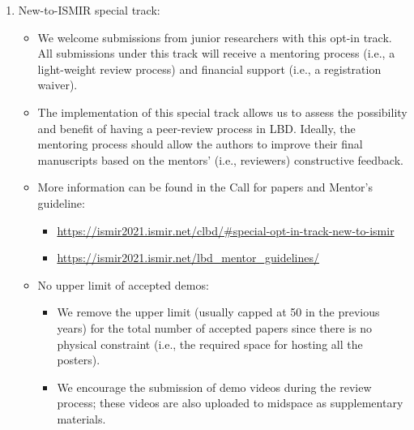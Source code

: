 \documentclass[%
10pt,								%
]
{scrartcl}
\begin{document}
            \begin{enumerate}
                \item New-to-ISMIR special track:
                    \begin{itemize}
                        \item We welcome submissions from junior researchers with this opt-in track. All submissions under this track will receive a mentoring process (i.e., a light-weight review process) and financial support (i.e., a registration waiver).

                        \item   The implementation of this special track allows us to assess the possibility and benefit of having a peer-review process in LBD. Ideally, the mentoring process should allow the authors to improve their final manuscripts based on the mentors’ (i.e., reviewers) constructive feedback.  
                        \item   More information can be found in the Call for papers and Mentor's guideline: 
                            \begin{itemize}
                                \item \href{https://ismir2021.ismir.net/clbd/#special-opt-in-track-new-to-ismir}{https://ismir2021.ismir.net/clbd/\#special-opt-in-track-new-to-ismir}
                                \item \href{https://ismir2021.ismir.net/lbd_mentor_guidelines/}{https://ismir2021.ismir.net/lbd\_mentor\_guidelines/}
                            \end{itemize}

                        \item   No upper limit of accepted demos: 
                            \begin{itemize}
                                \item We remove the upper limit (usually capped at 50 in the previous years) for the total number of accepted papers since there is no physical constraint (i.e., the required space for hosting all the posters).

                                \item   We encourage the submission of demo videos during the review process; these videos are also uploaded to midspace as supplementary materials. 
                            \end{itemize}
                    \end{itemize}
            \end{enumerate}
\end{document}
